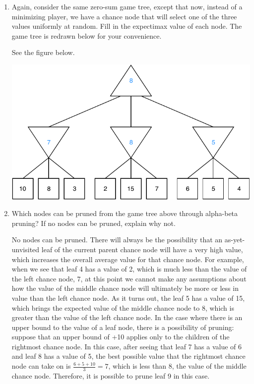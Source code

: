 \documentclass[9pt,a4paper]{extarticle}
\newenvironment{solution}
    {%
    \color{red}
    }
    { 
    \color{black}
    }
\begin{document}
\begin{enumerate}
\begin{solution}
\begin{center}
    \end{center}
    \end{solution}
    \item  Again, consider the same zero-sum game tree, except that now, instead of a minimizing player, we have a chance node that will select one of the three values uniformly at random. Fill in the expectimax value of each node. The game tree is redrawn below for your convenience.
    \begin{solution}
    See the figure below.
    \begin{center}
        \includegraphics[width=.7\textwidth]{figures/minimax_sol_2.pdf}
    \end{center}
    \end{solution}
    \item Which nodes can be pruned from the game tree above through alpha-beta pruning? If no nodes can be pruned, explain why not.
    \begin{solution}
    No nodes can be pruned. There will always be the possibility that an as-yet-unvisited leaf of the current parent chance node will have a very high value, which increases the overall average value for that chance node. For example, when we see that leaf 4 has a value of 2, which is much less than the value of the left chance node, 7, at this point we cannot make any assumptions about how the value of the middle chance node will ultimately be more or less in value than the left chance node. As it turns out, the leaf 5 has a value of 15, which brings the expected value of the middle chance node to 8, which is greater than the value of the left chance node. In the case where there is an upper bound to the value of a leaf node, there is a possibility of pruning: suppose that an upper bound of +10 applies only to the children of the rightmost chance node. In this case, after seeing that leaf 7 has a value of 6 and leaf 8 has a value of 5, the best possible value that the rightmost chance node can take on is $\frac{6+5+10}{3} = 7$, which is less than 8, the value of the middle chance node. Therefore, it is possible to prune leaf 9 in this case.
    \end{solution}
\end{enumerate}
\end{document}
